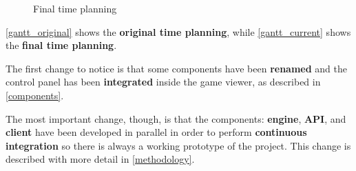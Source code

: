 \documentclass[a4paper,11pt]{article}
\begin{document}
\begin{figure}[H]
\caption{Final time planning}
\label{gantt_current}
\end{figure}
\autoref{gantt_original} shows the \textbf{original time planning}, while \autoref{gantt_current} shows the \textbf{final time
planning}.

The first change to notice is that some components have been \textbf{renamed} and the control panel has been
\textbf{integrated} inside the game viewer, as described in \autoref{components}.

The most important change, though, is that the components: \textbf{engine}, \textbf{API}, and \textbf{client} have been developed
in parallel in order to perform \textbf{continuous integration} so there is always a working prototype of the project.
This change is described with more detail in \autoref{methodology}.
\end{document}
